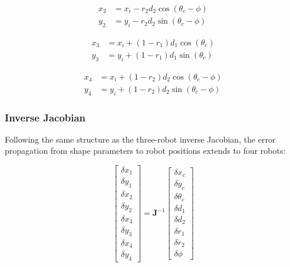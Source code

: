 \documentclass[lettersize,journal]{IEEEtran}
\begin{document}
\begin{equation}
\begin{aligned}
x_2 &= x_i - r_2 d_2 \cos(\theta_c - \phi) \\
y_2 &= y_i - r_2 d_2 \sin(\theta_c - \phi)
\end{aligned}
\end{equation}

\begin{equation}
\begin{aligned}
x_3 &= x_i + (1 - r_1) d_1 \cos(\theta_c) \\
y_3 &= y_i + (1 - r_1) d_1 \sin(\theta_c)
\end{aligned}
\end{equation}

\begin{equation}
\begin{aligned}
x_4 &= x_i + (1 - r_2) d_2 \cos(\theta_c - \phi) \\
y_4 &= y_i + (1 - r_2) d_2 \sin(\theta_c - \phi)
\end{aligned}
\end{equation}

\subsubsection{Inverse Jacobian}

Following the same structure as the three-robot inverse Jacobian, the error propagation from shape parameters to robot positions extends to four robots:

\begin{equation}
\begin{bmatrix}
\delta x_1 \\ \delta y_1 \\ \delta x_2 \\ \delta y_2 \\ \delta x_3 \\ \delta y_3 \\ \delta x_4 \\ \delta y_4
\end{bmatrix} =
\mathbf{J}^{-1}
\begin{bmatrix}
\delta x_c \\ \delta y_c \\ \delta \theta_c \\ \delta d_1 \\ \delta d_2 \\ \delta r_1 \\ \delta r_2 \\ \delta \phi
\end{bmatrix}
\end{equation}
\end{document}
